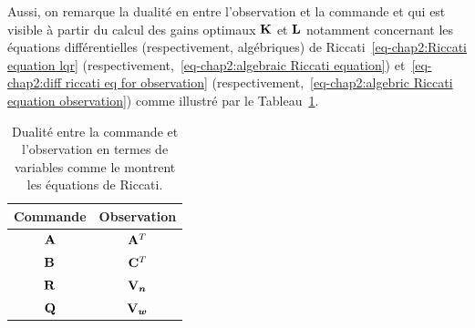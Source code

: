 Aussi, on remarque la dualité en entre l'observation et la commande et qui est visible à partir du calcul des gains optimaux $\mathbf{K}$  et  $\mathbf{L}$ notamment concernant les équations différentielles (respectivement, algébriques) de Riccati~\eqref{eq-chap2:Riccati equation lqr} (respectivement,~\eqref{eq-chap2:algebraic Riccati equation}) et~\eqref{eq-chap2:diff riccati eq for observation} (respectivement,~\eqref{eq-chap2:algebric Riccati equation observation}) comme illustré par le Tableau~\ref{tab:dualité LQR LQG}.
\begin{table}
	\centering
	\caption{Dualité entre la commande et l'observation en termes de variables comme le montrent les équations de Riccati. }
	\label{tab:dualité LQR LQG}
	\begin{tabular}{|c|c|} \hline
		 Commande & Observation \\ \hline \hline
		$\mathbf{A}$ & $\mathbf{A}^T$\\ \hline
		$\mathbf{B}$ & $\mathbf{C}^T$\\ \hline
		$\mathbf{R}$ & $\mathbf{V}_{\bm n}$ \\ \hline
		$\mathbf{Q}$ & $\mathbf{V}_{\bm w}$ \\ \hline
	\end{tabular}
\end{table}

